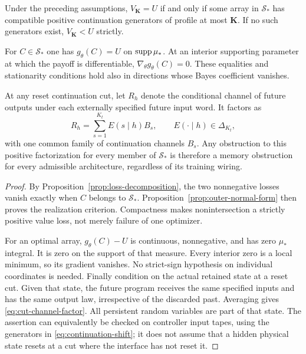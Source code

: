 \begin{theorem}
\label{thm:saddle-realization}
Under the preceding assumptions, $V_{\mathbf K}=U$ if and
only if some array in $\mathcal S_*$ has compatible positive
continuation generators of profile at most $\mathbf K$.
If no such generators exist, $V_{\mathbf K}<U$ strictly.

For $C\in\mathcal S_*$ one has $g_\theta(C)=U$ on
$\operatorname{supp}\mu_*$. At an interior supporting parameter at which the payoff
is differentiable, $\nabla_\theta g_\theta(C)=0$. These equalities and
stationarity conditions hold also in directions whose Bayes coefficient
vanishes.

At any reset continuation cut, let $R_h$ denote the conditional channel
of future outputs under each externally specified future input word.
It factors as
\begin{equation}\label{eq:cut-channel-factor}
                  R_h=\sum_{s=1}^{K_t}E(s\mid h)B_s,
 \qquad E(\cdot\mid h)\in\Delta_{K_t},
\end{equation}
with one common family of continuation channels $B_s$.
Any obstruction to this positive factorization for every member of
$\mathcal S_*$ is therefore a memory obstruction for every admissible
architecture, regardless of its training wiring.
\end{theorem}
\begin{proof}
By Proposition~\ref{prop:loss-decomposition}, the two nonnegative
losses vanish exactly when $C$ belongs to $\mathcal S_*$.
Proposition~\ref{prop:outer-normal-form} then proves the realization
criterion. Compactness makes nonintersection
a strictly positive value loss, not merely failure of one optimizer.

For an optimal array, $g_\theta(C)-U$ is continuous, nonnegative, and
has zero $\mu_*$ integral. It is zero on the support of that measure.
Every interior zero is a local minimum, so its gradient vanishes.
No strict-sign hypothesis on individual coordinates is needed.
Finally condition on the actual retained state at a reset cut. Given
that state, the future program receives the same specified inputs and
has the same output law, irrespective of the discarded past. Averaging
gives \eqref{eq:cut-channel-factor}. All persistent random variables
are part of that state. The assertion can equivalently be checked on
controller input tapes, using the generators in
\eqref{eq:continuation-shift}; it does not assume that a hidden
physical state resets at a cut where the interface has not reset it.
\end{proof}


